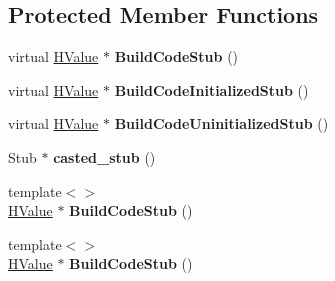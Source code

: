 \subsection*{Protected Member Functions}
\begin{DoxyCompactItemize}
\item 
\hypertarget{classv8_1_1internal_1_1_code_stub_graph_builder_aa95c2e46b376237c77ecb1fe26fe6945}{}virtual \hyperlink{classv8_1_1internal_1_1_h_value}{H\+Value} $\ast$ {\bfseries Build\+Code\+Stub} ()\label{classv8_1_1internal_1_1_code_stub_graph_builder_aa95c2e46b376237c77ecb1fe26fe6945}

\item 
\hypertarget{classv8_1_1internal_1_1_code_stub_graph_builder_a326e25bb79fa03fb3feef4281462e6cf}{}virtual \hyperlink{classv8_1_1internal_1_1_h_value}{H\+Value} $\ast$ {\bfseries Build\+Code\+Initialized\+Stub} ()\label{classv8_1_1internal_1_1_code_stub_graph_builder_a326e25bb79fa03fb3feef4281462e6cf}

\item 
\hypertarget{classv8_1_1internal_1_1_code_stub_graph_builder_ada64084a6723f763ea9c8bc534ef08ec}{}virtual \hyperlink{classv8_1_1internal_1_1_h_value}{H\+Value} $\ast$ {\bfseries Build\+Code\+Uninitialized\+Stub} ()\label{classv8_1_1internal_1_1_code_stub_graph_builder_ada64084a6723f763ea9c8bc534ef08ec}

\item 
\hypertarget{classv8_1_1internal_1_1_code_stub_graph_builder_a86a5f776b83d893110bee92b9374249a}{}Stub $\ast$ {\bfseries casted\+\_\+stub} ()\label{classv8_1_1internal_1_1_code_stub_graph_builder_a86a5f776b83d893110bee92b9374249a}

\item 
\hypertarget{classv8_1_1internal_1_1_code_stub_graph_builder_aa33f725f489fc7e8b66c2fe14a27392f}{}{\footnotesize template$<$$>$ }\\\hyperlink{classv8_1_1internal_1_1_h_value}{H\+Value} $\ast$ {\bfseries Build\+Code\+Stub} ()\label{classv8_1_1internal_1_1_code_stub_graph_builder_aa33f725f489fc7e8b66c2fe14a27392f}

\item 
\hypertarget{classv8_1_1internal_1_1_code_stub_graph_builder_a92c5dff1a95b5f0c1e76d586d895da52}{}{\footnotesize template$<$$>$ }\\\hyperlink{classv8_1_1internal_1_1_h_value}{H\+Value} $\ast$ {\bfseries Build\+Code\+Stub} ()\label{classv8_1_1internal_1_1_code_stub_graph_builder_a92c5dff1a95b5f0c1e76d586d895da52}


\end{DoxyCompactItemize}
